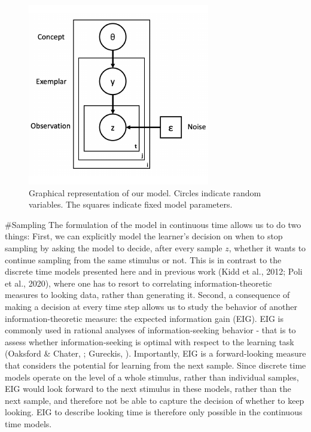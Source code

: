 \documentclass[10pt, letterpaper]{article}
\newenvironment{CodeChunk}{}{}
\begin{document}
\begin{CodeChunk}
\begin{figure}[H]

{\centering \includegraphics{figs/image-1} 

}

\caption[Graphical representation of our model]{Graphical representation of our model. Circles indicate random variables. The squares indicate fixed model parameters.}\label{fig:image}
\end{figure}
\end{CodeChunk}

\#Sampling The formulation of the model in continuous time allows us to
do two things: First, we can explicitly model the learner's decision on
when to stop sampling by asking the model to decide, after every sample
\(z\), whether it wants to continue sampling from the same stimulus or
not. This is in contrast to the discrete time models presented here and
in previous work (Kidd et al., 2012; Poli et al., 2020), where one has
to resort to correlating information-theoretic measures to looking data,
rather than generating it. Second, a consequence of making a decision at
every time step allows us to study the behavior of another
information-theoretic measure: the expected information gain (EIG). EIG
is commonly used in rational analyses of information-seeking behavior -
that is to assess whether information-seeking is optimal with respect to
the learning task (Oaksford \& Chater, ; Gureckis, ). Importantly, EIG
is a forward-looking measure that considers the potential for learning
from the next sample. Since discrete time models operate on the level of
a whole stimulus, rather than individual samples, EIG would look forward
to the next stimulus in these models, rather than the next sample, and
therefore not be able to capture the decision of whether to keep
looking. EIG to describe looking time is therefore only possible in the
continuous time models.
\end{document}
